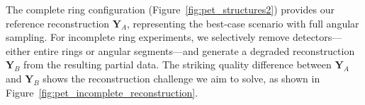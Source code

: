 \documentclass[aps,prb,preprint,groupedaddress,showkeys]{revtex4}
\begin{document}
The complete ring configuration (Figure~\ref{fig:pet_structures2}) provides our reference reconstruction $\mathbf{Y}_A$, representing the best-case scenario with full angular sampling. For incomplete ring experiments, we selectively remove detectors—either entire rings or angular segments—and generate a degraded reconstruction $\mathbf{Y}_B$ from the resulting partial data. The striking quality difference between $\mathbf{Y}_A$ and $\mathbf{Y}_B$ shows the reconstruction challenge we aim to solve, as shown in Figure~\ref{fig:pet_incomplete_reconstruction}.


\end{document}
